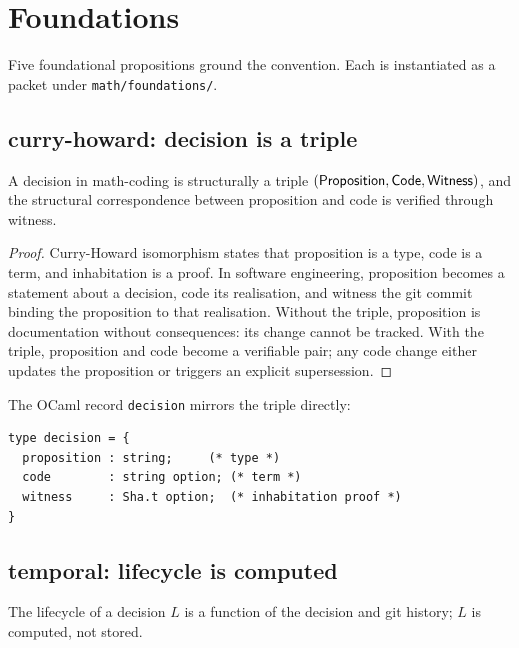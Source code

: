 
\section{Foundations}

Five foundational propositions ground the convention. Each is
instantiated as a packet under \texttt{math/foundations/}.

\subsection{curry-howard: decision is a triple}

\begin{theorem}
A decision in math-coding is structurally a triple $(\mathsf{Proposition}, \mathsf{Code}, \mathsf{Witness})$,
and the structural correspondence between proposition and code is
verified through witness.
\end{theorem}

\begin{proof}
Curry-Howard isomorphism states that proposition is a type, code is a
term, and inhabitation is a proof. In software engineering, proposition
becomes a statement about a decision, code its realisation, and
witness the git commit binding the proposition to that realisation.
Without the triple, proposition is documentation without consequences:
its change cannot be tracked. With the triple, proposition and code
become a verifiable pair; any code change either updates the
proposition or triggers an explicit supersession.
\end{proof}

\begin{theorem}
The OCaml record \texttt{decision} mirrors the triple directly:
\begin{verbatim}
type decision = {
  proposition : string;     (* type *)
  code        : string option; (* term *)
  witness     : Sha.t option;  (* inhabitation proof *)
}
\end{verbatim}
\end{theorem}

\subsection{temporal: lifecycle is computed}

\begin{theorem}
The lifecycle of a decision $L$ is a function of the decision and git
history; $L$ is computed, not stored.
\end{theorem}

